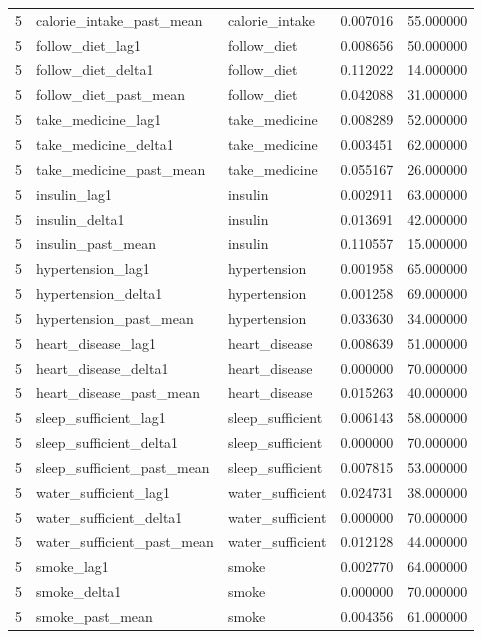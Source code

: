 \begin{longtable}{rllrr}
5 & calorie\_intake\_past\_mean & calorie\_intake & 0.007016 & 55.000000 \\
5 & follow\_diet\_lag1 & follow\_diet & 0.008656 & 50.000000 \\
5 & follow\_diet\_delta1 & follow\_diet & 0.112022 & 14.000000 \\
5 & follow\_diet\_past\_mean & follow\_diet & 0.042088 & 31.000000 \\
5 & take\_medicine\_lag1 & take\_medicine & 0.008289 & 52.000000 \\
5 & take\_medicine\_delta1 & take\_medicine & 0.003451 & 62.000000 \\
5 & take\_medicine\_past\_mean & take\_medicine & 0.055167 & 26.000000 \\
5 & insulin\_lag1 & insulin & 0.002911 & 63.000000 \\
5 & insulin\_delta1 & insulin & 0.013691 & 42.000000 \\
5 & insulin\_past\_mean & insulin & 0.110557 & 15.000000 \\
5 & hypertension\_lag1 & hypertension & 0.001958 & 65.000000 \\
5 & hypertension\_delta1 & hypertension & 0.001258 & 69.000000 \\
5 & hypertension\_past\_mean & hypertension & 0.033630 & 34.000000 \\
5 & heart\_disease\_lag1 & heart\_disease & 0.008639 & 51.000000 \\
5 & heart\_disease\_delta1 & heart\_disease & 0.000000 & 70.000000 \\
5 & heart\_disease\_past\_mean & heart\_disease & 0.015263 & 40.000000 \\
5 & sleep\_sufficient\_lag1 & sleep\_sufficient & 0.006143 & 58.000000 \\
5 & sleep\_sufficient\_delta1 & sleep\_sufficient & 0.000000 & 70.000000 \\
5 & sleep\_sufficient\_past\_mean & sleep\_sufficient & 0.007815 & 53.000000 \\
5 & water\_sufficient\_lag1 & water\_sufficient & 0.024731 & 38.000000 \\
5 & water\_sufficient\_delta1 & water\_sufficient & 0.000000 & 70.000000 \\
5 & water\_sufficient\_past\_mean & water\_sufficient & 0.012128 & 44.000000 \\
5 & smoke\_lag1 & smoke & 0.002770 & 64.000000 \\
5 & smoke\_delta1 & smoke & 0.000000 & 70.000000 \\
5 & smoke\_past\_mean & smoke & 0.004356 & 61.000000 \\

\end{longtable}
